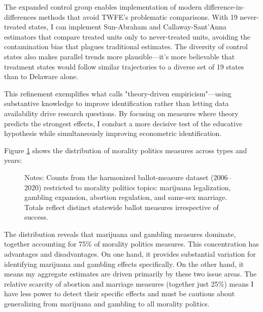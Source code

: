 \documentclass[12pt,letterpaper,oneside]{book}
\begin{document}
The expanded control group enables implementation of modern difference-in-differences methods that avoid TWFE's problematic comparisons. With 19 never-treated states, I can implement Sun-Abraham and Callaway-Sant'Anna estimators that compare treated units only to never-treated units, avoiding the contamination bias that plagues traditional estimates. The diversity of control states also makes parallel trends more plausible---it's more believable that treatment states would follow similar trajectories to a diverse set of 19 states than to Delaware alone.

This refinement exemplifies what \citet{sekhon2009opiates} calls "theory-driven empiricism"—using substantive knowledge to improve identification rather than letting data availability drive research questions. By focusing on measures where theory predicts the strongest effects, I conduct a more decisive test of the educative hypothesis while simultaneously improving econometric identification.

Figure \ref{fig:morality_distribution} shows the distribution of morality politics measures across types and years:

\begin{figure}[H]
\centering
{}
\caption{Distribution of Morality Politics Measures by Type}
\label{fig:morality_distribution}
\caption*{\footnotesize Notes: Counts from the harmonized ballot-measure dataset (2006--2020) restricted to morality politics topics: marijuana legalization, gambling expansion, abortion regulation, and same-sex marriage. Totals reflect distinct statewide ballot measures irrespective of success.}
\end{figure}

The distribution reveals that marijuana and gambling measures dominate, together accounting for 75\% of morality politics measures. This concentration has advantages and disadvantages. On one hand, it provides substantial variation for identifying marijuana and gambling effects specifically. On the other hand, it means my aggregate estimates are driven primarily by these two issue areas. The relative scarcity of abortion and marriage measures (together just 25\%) means I have less power to detect their specific effects and must be cautious about generalizing from marijuana and gambling to all morality politics.
\end{document}
